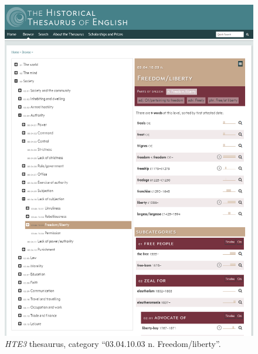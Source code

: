 \begin{figure}[htbp]
  \centering
    \includegraphics[width=\linewidth]{Stolk_thes-content/fig/thes/HTE3-thesaurus-freedomliberty.png}
  \caption{\textit{HTE3} thesaurus, category ``03.04.10.03 n. Freedom/liberty''.}
  \label{fig:1.A:HTE3:thesaurus}
\end{figure}

